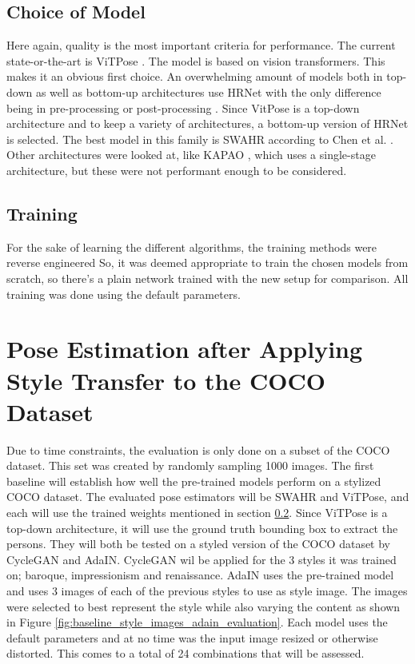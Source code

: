 \subsection{Choice of Model}
\label{sec:baseline_choice_pose_estimation}
Here again, quality is the most important criteria for performance.
The current state-or-the-art is ViTPose \cite{xu2023}.
The model is based on vision transformers.
This makes it an obvious first choice.
An overwhelming amount of models both in top-down as well as bottom-up architectures use HRNet \cite{Sun2019} with the only difference being in pre-processing \cite{Zhang2019, Huang2019} or post-processing \cite{Cheng2019, Geng2021}.
Since VitPose is a top-down architecture and to keep a variety of architectures, a bottom-up version of HRNet is selected.
The best model in this family is SWAHR according to Chen et al. \cite{chen2022}.
Other architectures were looked at, like KAPAO \cite{William2021}, which uses a single-stage architecture, but these were not performant enough to be considered.

\subsection{Training}
\label{sec:baseline_training_pose_estimation}
For the sake of learning the different algorithms, the training methods were reverse engineered
So, it was deemed appropriate to train the chosen models from scratch, so there's a plain network trained with the new setup for comparison.
All training was done using the default parameters.

\section{Pose Estimation after Applying Style Transfer to the COCO Dataset}
\label{sec:baseline_coco_style_transfer}
Due to time constraints, the evaluation is only done on a subset of the COCO dataset.
This set was created by randomly sampling 1000 images.
The first baseline will establish how well the pre-trained models perform on a stylized COCO dataset.
The evaluated pose estimators will be SWAHR and ViTPose, and each will use the trained weights mentioned in section \ref{sec:baseline_training_pose_estimation}.
Since ViTPose is a top-down architecture, it will use the ground truth bounding box to extract the persons.
They will both be tested on a styled version of the COCO dataset by CycleGAN and AdaIN.
CycleGAN wil be applied for the 3 styles it was trained on; baroque, impressionism and renaissance.
AdaIN uses the pre-trained model and uses 3 images of each of the previous styles to use as style image.
The images were selected to best represent the style while also varying the content as shown in Figure \ref{fig:baseline_style_images_adain_evaluation}.
Each model uses the default parameters and at no time was the input image resized or otherwise distorted.
This comes to a total of 24 combinations that will be assessed.

